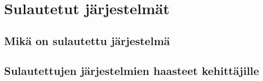 \chapter{Sulautetut järjestelmät} \label{Neljäs luku}

\section{Mikä on sulautettu järjestelmä}
\section{Sulautettujen järjestelmien haasteet kehittäjille}
